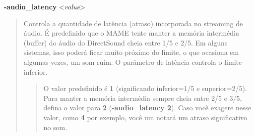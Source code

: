 \documentclass[letterpaper,10pt,brazil]{sphinxmanual}
\begin{document}
\label{commandline/commandline-all:mame-commandline-audiolatency}
\textbf{-audio\_latency} \textless{}\emph{value}\textgreater{}
\begin{quote}

Controla a quantidade de latência (atraso) incorporada no streaming
de áudio. É predefinido que o MAME tente manter a memória intermédia
(buffer) do áudio do DirectSound cheia entre 1/5 e 2/5.
Em alguns sistemas, isso poderá ficar muito próximo do limite, o que
ocasiona em algumas vezes, um som ruim. O parâmetro de latência
controla o limite inferior.
\begin{quote}

O valor predefinido é \textbf{1} (significando inferior=1/5 e
superior=2/5). Para manter a memória intermédia sempre cheia entre
2/5 e 3/5, defina o valor para \textbf{2} (\textbf{-audio\_latency 2}).
Caso você exagere nesse valor, como \textbf{4} por exemplo, você um
notará um atraso significativo no som.
\end{quote}
\end{quote}
\clearpage
\end{document}
